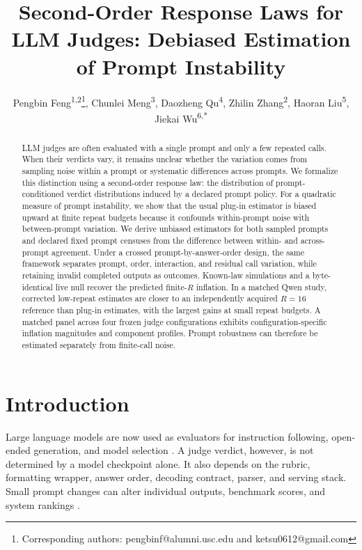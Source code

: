 \documentclass[letterpaper]{article}
\title{Second-Order Response Laws for LLM Judges: Debiased Estimation of Prompt Instability}
\author{
Pengbin Feng\textsuperscript{\rm 1,2}\thanks{Corresponding authors: pengbinf@alumni.usc.edu and ketsu0612@gmail.com},
Chunlei Meng\textsuperscript{\rm 3},
Daozheng Qu\textsuperscript{\rm 4},
Zhilin Zhang\textsuperscript{\rm 2},
Haoran Liu\textsuperscript{\rm 5},
Jiekai Wu\textsuperscript{\rm 6,*}
}
\newcommand{\1}{\mathbf 1}
\begin{document}
\maketitle

\begin{abstract}
LLM judges are often evaluated with a single prompt and only a few repeated calls. When their verdicts vary, it remains unclear whether the variation comes from sampling noise within a prompt or systematic differences across prompts. We formalize this distinction using a second-order response law: the distribution of prompt-conditioned verdict distributions induced by a declared prompt policy. For a quadratic measure of prompt instability, we show that the usual plug-in estimator is biased upward at finite repeat budgets because it confounds within-prompt noise with between-prompt variation. We derive unbiased estimators for both sampled prompts and declared fixed prompt censuses from the difference between within- and across-prompt agreement. Under a crossed prompt-by-answer-order design, the same framework separates prompt, order, interaction, and residual call variation, while retaining invalid completed outputs as outcomes. Known-law simulations and a byte-identical live null recover the predicted finite-$R$ inflation. In a matched Qwen study, corrected low-repeat estimates are closer to an independently acquired $R=16$ reference than plug-in estimates, with the largest gains at small repeat budgets. A matched panel across four frozen judge configurations exhibits configuration-specific inflation magnitudes and component profiles. Prompt robustness can therefore be estimated separately from finite-call noise.
\end{abstract}

\section{Introduction}

Large language models are now used as evaluators for instruction following,
open-ended generation, and model selection
\citep{zheng2023judging,zeng2024llmbar,tan2024judgebench}. A judge verdict,
however, is not determined by a model checkpoint alone. It also depends on the
rubric, formatting wrapper, answer order, decoding contract, parser, and
serving stack. Small prompt changes can alter individual outputs, benchmark
scores, and system rankings
\citep{sclar2023formatspread,zhu2023promptrobust,chatterjee2024posix,
zhuo2024prosa,romanou2026brittlebench,bellibatlu2026judgesense}.
\end{document}

